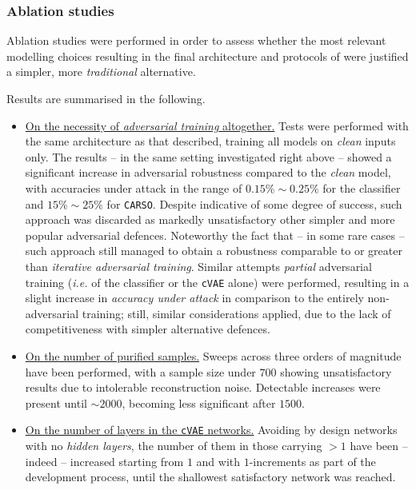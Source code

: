 \subsubsection{Ablation studies}
Ablation studies were performed in order to assess whether the most relevant modelling choices resulting in the final architecture and protocols of \carso were justified \wrt a simpler, more \textit{traditional} alternative.

Results are summarised in the following.

\begin{itemize}
    \item \underline{On the necessity of \textit{adversarial training} altogether.} Tests were performed with the same architecture as that described, training all models on \textit{clean} inputs only. The results -- in the same setting investigated right above -- showed a significant increase in adversarial robustness compared to the \textit{clean} model, with accuracies under attack in the range of $0.15\%\sim0.25\%$ for the classifier and $15\%\sim25\%$ for \texttt{CARSO}. Despite indicative of some degree of success, such approach was discarded as markedly unsatisfactory \wrt other simpler and more popular adversarial defences. Noteworthy the fact that -- in some rare cases -- such approach still managed to obtain a robustness comparable to or greater than \textit{iterative adversarial training}. Similar attempts \wrt \textit{partial} adversarial training (\textit{i.e.} of the classifier or the \texttt{cVAE} alone) were performed, resulting in a slight increase in \textit{accuracy under attack} in comparison to the entirely non-adversarial training; still, similar considerations applied, due to the lack of competitiveness with simpler alternative defences.
    \item \underline{On the number of purified samples.} Sweeps across three orders of magnitude have been performed, with a sample size under $700$ showing unsatisfactory results due to intolerable reconstruction noise. Detectable increases were present until $\sim2000$, becoming less significant after $1500$.
    \item \underline{On the number of layers in the \texttt{cVAE} networks.} Avoiding by design networks with no \textit{hidden layers}, the number of them in those carrying $>1$ have been -- indeed -- increased starting from $1$ and with $1$-increments as part of the development process, until the shallowest satisfactory network was reached.
\end{itemize}

